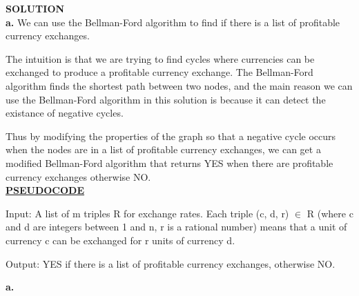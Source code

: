 \documentclass[11pt]{csc_assignment}
\begin{document}
\begin{description}

\newpage
\item[Q1.]

\textbf{SOLUTION}
\\

\textbf{a.} We can use the Bellman-Ford algorithm to find if there is a list of profitable currency exchanges.

The intuition is that we are trying to find cycles where currencies can be exchanged to produce a profitable currency exchange. The Bellman-Ford algorithm finds the shortest path between two nodes, and the main reason we can use the Bellman-Ford algorithm in this solution is because it can detect the existance of negative cycles.

Thus by modifying the properties of the graph so that a negative cycle occurs when the nodes are in a list of profitable currency exchanges, we can get a modified Bellman-Ford algorithm that returns YES when there are profitable currency exchanges otherwise NO.\\

\underline{\textbf{PSEUDOCODE}}

Input: A list of m triples R for exchange rates. Each triple (c, d, r) $\in$ R (where c and d are integers between 1 and n, r is a rational number) means that a unit of currency c can be exchanged for r units of currency d.

Output: YES if there is a list of profitable currency exchanges, otherwise NO.



\newpage
\item[Q2.]
\textbf{a.}


\end{description}
\end{document}
